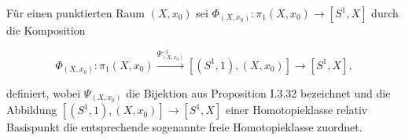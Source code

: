 \documentclass[10pt]{article}
\begin{document}
Für einen punktierten Raum $\left(X, x_{0}\right)$ sei $\Phi_{\left(X, x_{0}\right)}: \pi_{1}\left(X, x_{0}\right) \rightarrow\left[S^{1}, X\right]$ durch die Komposition

$$
\Phi_{\left(X, x_{0}\right)}: \pi_{1}\left(X, x_{0}\right) \xrightarrow{\Psi_{\left(X, x_{0}\right)}^{-1}}\left[\left(S^{1}, 1\right),\left(X, x_{0}\right)\right] \rightarrow\left[S^{1}, X\right],
$$

definiert, wobei $\Psi_{\left(X, x_{0}\right)}$ die Bijektion aus Proposition I.3.32 bezeichnet und die Abbildung $\left[\left(S^{1}, 1\right),\left(X, x_{0}\right)\right] \rightarrow\left[S^{1}, X\right]$ einer Homotopieklasse relativ Basispunkt die entsprechende sogenannte freie Homotopieklasse zuordnet.
\end{document}
